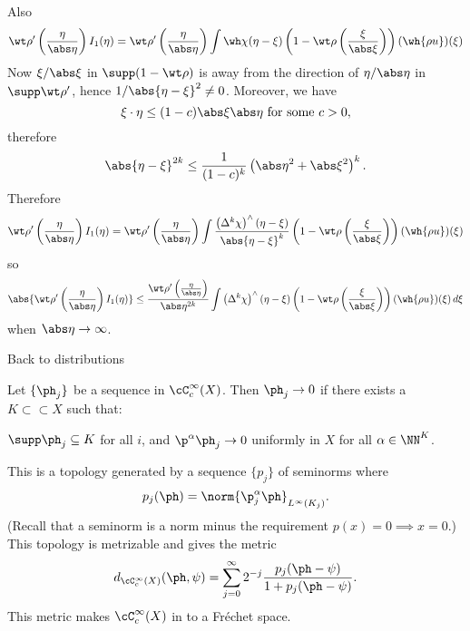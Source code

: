 Also
\begin{equation*}
  \wt\rho'\left( \frac\eta{\abs\eta} \right)I_1(\eta) = \wt\rho'\left( \frac\eta{\abs\eta} \right) \int \wh\chi(\eta-\xi)\left( 1-\wt\rho\left( \frac\xi{\abs\xi} \right) \right) (\wh{\rho u})(\xi)
\end{equation*}
Now $\xi/\abs\xi$ in $\supp(1-\wt\rho)$ is away from the direction of $\eta/\abs\eta$ in $\supp\wt\rho'$, hence $1/\abs{\eta-\xi}^2\neq0$.
Moreover, we have
\[ \xi\cdot\eta \leq (1-c)\abs\xi\abs\eta \text{ for some } c>0, \]
therefore
\[ \abs{\eta-\xi}^{2k} \leq \frac1{(1-c)^k}\left( \abs\eta^2+\abs\xi^2 \right)^k. \]
Therefore
\begin{equation*}
  \wt\rho'\left( \frac\eta{\abs\eta} \right)I_1(\eta) = \wt\rho'\left( \frac\eta{\abs\eta} \right) \int \frac{\left(\Delta^k\chi \right)^\wedge(\eta-\xi)}{\abs{\eta-\xi}^k} \left( 1-\wt\rho\left( \frac\xi{\abs\xi} \right) \right) (\wh{\rho u})(\xi)
\end{equation*}
so
\begin{equation*}
  \abs{\wt\rho'\left( \frac\eta{\abs\eta} \right)I_1(\eta)} \leq \frac{\wt\rho'\left( \frac{\eta}{\abs\eta} \right)}{\abs\eta^{2k}} \int \left(\Delta^k\chi \right)^\wedge(\eta-\xi) \left( 1-\wt\rho\left( \frac\xi{\abs\xi} \right) \right) (\wh{\rho u})(\xi) \, d\xi
\end{equation*}
when $\abs\eta\to\infty$.

Back to distributions

\begin{defn}
  Let $\{\ph_j\}$ be a sequence in $\cC_c^\infty(X)$.
  Then $\ph_j \to 0$ if there exists a $K \subset\subset X$ such that:
  \begin{enum}
    \io $\supp\ph_j\subseteq K$ for all $i$, and
    \io $\p^\alpha\ph_j \to 0$ uniformly in $X$ for all $\alpha\in\NN^K$.
  \end{enum}
\end{defn}

\begin{rmk}
  This is a topology generated by a sequence $\{p_j\}$ of seminorms where
  \[ p_j(\ph) = \norm{\p^\alpha_j\ph}_{L^\infty(K_j)}. \]
  (Recall that a seminorm is a norm minus the requirement $p(x)=0\implies x=0$.)
  This topology is metrizable and gives the metric
  \[ d_{\cC_c^\infty(X)}(\ph,\psi) = \sum_{j=0}^\infty 2^{-j} \frac{p_j(\ph-\psi)}{1+p_j(\ph-\psi)}. \]
  This metric makes $\cC_c^\infty(X)$ in to a Fr\'echet space.
\end{rmk}

